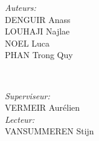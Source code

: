 \documentclass[12pt]{report}
\makeatletter
\let\thedate\@date
\makeatother
\begin{document}
\begin{titlepage}
    \begin{minipage}{0.4\textwidth}
        \begin{flushleft} \large
            \emph{Auteurs:}\\
            \small DENGUIR Anass\\
			\small LOUHAJI Najlae\\
			\small NOEL Luca\\ 
			\small PHAN Trong Quy\\
            \end{flushleft}
            \end{minipage}~
            \begin{minipage}{0.4\textwidth}
            \begin{flushright} \large
            \emph{Superviseur:}\\
            \small VERMEIR Aur\'{e}lien\\
            \vspace{1 cm}
            \emph{Lecteur:}\\                                         
            \small VANSUMMEREN Stijn\\
        \end{flushright}
    \end{minipage}\\[2 cm]
    
    \vspace{1.5 cm}
    {\large \thedate}\\[2 cm]
 
    \vfill
    
\end{titlepage}

\tableofcontents
\end{document}
